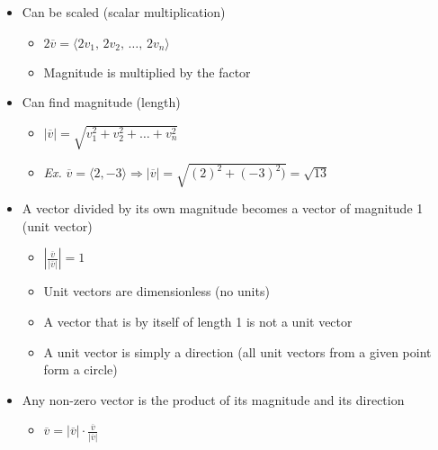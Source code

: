 \begin{itemize}
\begin{itemize}
      \item Can be scaled (scalar multiplication)

        \begin{itemize}

          \item $2\overline{v}=\langle 2v_1,\,2v_2,\,\dots,\,2v_n \rangle$

          \item Magnitude is multiplied by the factor

        \end{itemize}

      \item Can find magnitude (length)

        \begin{itemize}

          \item $|\overline{v}|=\sqrt{v_1^2+v_2^2+\dots+v_n^2}$

          \item \textit{Ex.} $\overline{v}=\langle 2, -3 \rangle \Rightarrow |\overline{v}| = \sqrt{(2)^2 + (-3)^2)} = \sqrt{13}$

        \end{itemize}

      \item A vector divided by its own magnitude becomes a vector of magnitude 1 (unit vector)

        \begin{itemize}

          \item $|\frac{\overline{v}}{|\overline{v}|}|=1$

          \item Unit vectors are dimensionless (no units)

          \item A vector that is by itself of length 1 is not a unit vector

          \item A unit vector is simply a direction (all unit vectors from a given point form a circle)

        \end{itemize}

      \item Any non-zero vector is the product of its magnitude and its direction

        \begin{itemize}

          \item $\overline{v} = |\overline{v}| \cdot \frac{\overline{v}}{|\overline{v}|}$


\end{itemize}
\end{itemize}
\end{itemize}
